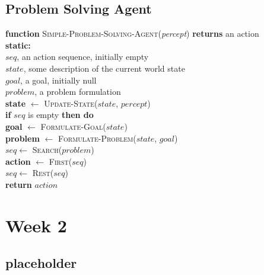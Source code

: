\documentclass[a4paper, 12pt]{article}
\begin{document}
    \subsection{Problem Solving Agent}
        \begin{framed}
            \noindent
            \textbf{function} \textsc{Simple-Problem-Solving-Agent}(\textit{percept}) \textbf{returns} an action \\
            \textbf{static:} \\
            \quad $seq$, an action sequence, initially empty \\
            \quad $state$, some description of the current world state \\
            \quad $goal$, a goal, initially null \\
            \quad $problem$, a problem formulation \\
            
            \noindent
            \textbf{state} $\leftarrow$ \textsc{Update-State}($state$, $percept$) \\
            \textbf{if} $seq$ is empty \textbf{then do} \\
            \quad \textbf{goal} $\leftarrow$ \textsc{Formulate-Goal}($state$) \\
            \quad \textbf{problem} $\leftarrow$ \textsc{Formulate-Problem}($state$, $goal$) \\
            \quad $seq \leftarrow$ \textsc{Search}($problem$) \\
            \textbf{action} $\leftarrow$ \textsc{First}($seq$) \\
            $seq \leftarrow$ \textsc{Rest}($seq$) \\
            
            \noindent
            \textbf{return} $action$
        \end{framed}
    
\newpage
\section{Week 2}
    \subsection{placeholder}
\end{document}

